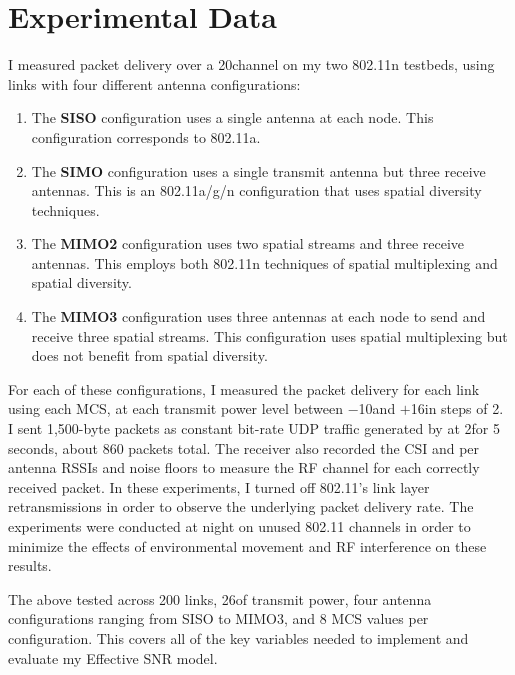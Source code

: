 \section{Experimental Data}
I measured packet delivery over a 20\MHz channel on my two 802.11n testbeds, using links with four different antenna configurations:
\begin{enumerate}[parsep=1ex,itemsep=1ex,topsep=1ex]
\item The \textbf{SISO} configuration uses a single antenna at each node. This configuration corresponds to 802.11a.
\item The \textbf{SIMO} configuration uses a single transmit antenna but three receive antennas. This is an 802.11a/g/n configuration that uses spatial diversity techniques.
\item The \textbf{MIMO2} configuration uses two spatial streams and three receive antennas. This employs both 802.11n techniques of spatial multiplexing and spatial diversity.
\item The \textbf{MIMO3} configuration uses three antennas at each node to send and receive three spatial streams. This configuration uses spatial multiplexing but does not benefit from spatial diversity.
\end{enumerate}

For each of these configurations, I measured the packet delivery for each link using each MCS, at each transmit power level between $-$10\dBm and $+$16\dBm in steps of 2\dB. I sent 1,500-byte packets as constant bit-rate UDP traffic generated by  at 2\Mbps for 5 seconds, about 860 packets total. The receiver also recorded the CSI and per antenna RSSIs and noise floors to measure the RF channel for each correctly received packet. In these experiments, I turned off 802.11's link layer retransmissions in order to observe the underlying packet delivery rate. The experiments were conducted at night on unused 802.11 channels in order to minimize the effects of environmental movement and RF interference on these results.


The above tested across 200 links, 26\dB of transmit power, four antenna configurations ranging from SISO to MIMO3, and 8 MCS values per configuration. This covers all of the key variables needed to implement and evaluate my Effective SNR model.

